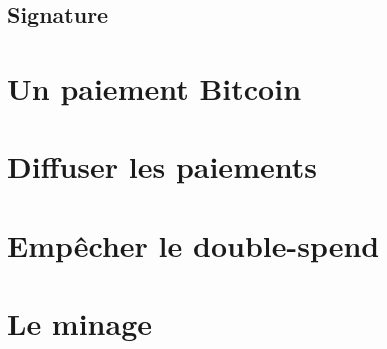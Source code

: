 \documentclass[11pt,a4paper]{article}
\begin{document}
\subsection{Signature}

\section{Un paiement Bitcoin}

\section{Diffuser les paiements}

\section{Empêcher le double-spend}

\section{Le minage}

{}

\end{document}
